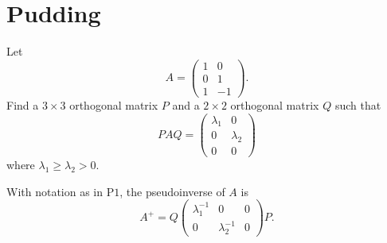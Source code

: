 \documentclass[answers]{exam}
\begin{document}
\section*{Pudding}
\begin{questions}

\question%
Let \[
	A=\begin{pmatrix}
		1 & 0 \\
		0 & 1 \\
		1 & -1
	\end{pmatrix}.
\] Find a $3 \times 3$ orthogonal matrix $P$ and a $2 \times 2$ orthogonal matrix $Q$ such that \[
	P A Q=\begin{pmatrix}
		\lambda_{1} & 0 \\
		0 & \lambda_{2} \\
		0 & 0
	\end{pmatrix}
\] where $\lambda_{1} \geqslant \lambda_{2}>0$.



\question%
With notation as in $\mathrm{P} 1$, the pseudoinverse of $A$ is \[
	A^{+}=Q\begin{pmatrix}
		\lambda_{1}^{-1} & 0 & 0 \\
		0 & \lambda_{2}^{-1} & 0
	\end{pmatrix} P.
\]



\question%
\begin{parts}

\end{parts}
\end{questions}
\end{document}
